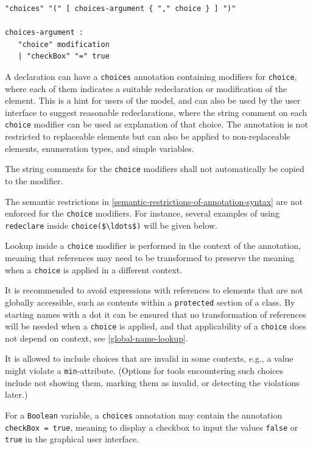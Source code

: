 \begin{annotationdefinition}[choices]
\begin{synopsis}[grammar]\begin{lstlisting}
"choices" "(" [ choices-argument { "," choice } ] ")"

choices-argument :
   "choice" modification
   | "checkBox" "=" true
\end{lstlisting}\end{synopsis}
\begin{semantics}
A declaration can have a \lstinline!choices! annotation containing modifiers for \lstinline!choice!, where each of them indicates a suitable redeclaration or modification of the element.
This is a hint for users of the model, and can also be used by the user interface to suggest reasonable redeclarations, where the string comment on each \lstinline!choice! modifier can be used as explanation of that choice.
The annotation is not restricted to replaceable elements but can also be applied to non-replaceable elements, enumeration types, and simple variables.

The string comments for the \lstinline!choice! modifiers shall not automatically be copied to the modifier.

The semantic restrictions in \cref{semantic-restrictions-of-annotation-syntax} are not enforced for the \lstinline!choice! modifiers.
For instance, several examples of using \lstinline!redeclare! inside \lstinline!choice($\ldots$)! will be given below.

Lookup inside a \lstinline!choice! modifier is performed in the context of the annotation, meaning that references may need to be transformed to preserve the meaning when a \lstinline!choice! is applied in a different context.

\begin{nonnormative}
It is recommended to avoid expressions with references to elements that are not globally accessible, such as contents within a \lstinline!protected! section of a class.
By starting names with a dot it can be ensured that no transformation of references will be needed when a \lstinline!choice! is applied, and that applicability of a \lstinline!choice! does not depend on context, see \cref{global-name-lookup}.
\end{nonnormative}

It is allowed to include choices that are invalid in some contexts, e.g., a value might violate a \lstinline!min!-attribute.
(Options for tools encountering such choices include not showing them, marking them as invalid, or detecting the violations later.)

For a \lstinline!Boolean! variable, a \lstinline!choices! annotation may contain the annotation \lstinline!checkBox = true!, meaning to display a checkbox to input the values \lstinline!false! or \lstinline!true! in the graphical user interface.
\end{semantics}
\end{annotationdefinition}


